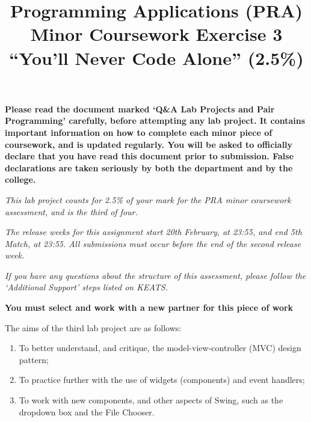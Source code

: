 \documentclass[11pt]{article}
\title{Programming Applications (PRA) \\ Minor Coursework Exercise 3 \\
``You'll Never Code Alone'' (2.5\%)}
\date{}                                           %
\begin{document}
\maketitle


\textbf{Please read the document marked `Q\&A Lab Projects and Pair Programming' carefully, before attempting any lab project. It contains important information on how to complete each minor piece of coursework, and is updated regularly. You will be asked to officially declare that you have read this document prior to submission. False declarations are taken seriously by both the department and by the college.}

\emph{This lab project counts for 2.5\% of your mark for the PRA minor coursework assessment, and is the third of four.}

\emph{The release weeks for this assignment start 20th February, at 23:55, and end 5th Match, at 23:55. All submissions must occur before the end of the second release week.}

\emph{If you have any questions about the structure of this assessment, please follow the `Additional Support' steps listed on KEATS.}

\textbf{You must select and work with a new partner for this piece of work}

The aims of the third lab project are as follows:

\begin{enumerate}
	
	\item To better understand, and critique, the model-view-controller (MVC) design pattern;
	
	\item To practice further with the use of widgets (components) and event handlers;
	
	\item To work with new components, and other aspects of Swing, such as the dropdown box and the File Chooser.

\end{enumerate}
\end{document}
